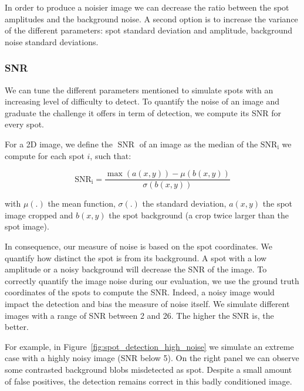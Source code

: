 In order to produce a noisier image we can decrease the ratio between the spot amplitudes and the background noise.
A second option is to increase the variance of the different parameters: spot standard deviation and amplitude, background noise standard deviations.

\subsubsection{\ac{SNR}}

We can tune the different parameters mentioned to simulate spots with an increasing level of difficulty to detect.
To quantify the noise of an image and graduate the challenge it offers in term of detection, we compute its \ac{SNR} for every spot.

\noindent
For a 2D image, we define the $\operatorname{SNR}$ of an image as the median of the $\operatorname{SNR_i}$ we compute for each spot $i$, such that:

\begin{equation}
	{\displaystyle \operatorname{SNR_i} = \frac{\max(a(x, y)) - \mu(b(x, y))}{\sigma(b(x, y))}}
\end{equation}

\noindent
with $\mu(.)$ the mean function, $\sigma(.)$ the standard deviation, $a(x, y)$ the spot image cropped and $b(x, y)$ the spot background (a crop twice larger than the spot image).

In consequence, our measure of noise is based on the spot coordinates.
We quantify how distinct the spot is from its background.
A spot with a low amplitude or a noisy background will decrease the \ac{SNR} of the image.
To correctly quantify the image noise during our evaluation, we use the ground truth coordinates of the spots to compute the \ac{SNR}.
Indeed, a noisy image would impact the detection and bias the measure of noise itself.
We simulate different images with a range of \ac{SNR} between 2 and 26.
The higher the \ac{SNR} is, the better.

For example, in Figure~\ref{fig:spot_detection_high_noise} we simulate an extreme case with a highly noisy image (\ac{SNR} below 5).
On the right panel we can observe some contrasted background blobs misdetected as spot.
Despite a small amount of false positives, the detection remains correct in this badly conditioned image.

